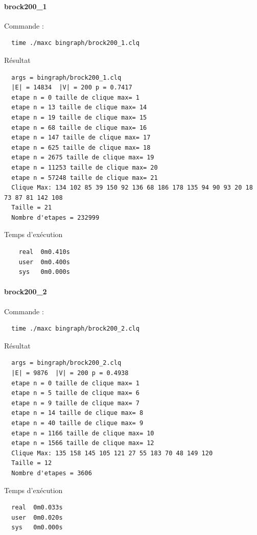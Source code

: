 \documentclass{article}
\begin{document}
\paragraph{brock200\_1}
Commande :
\begin{verbatim}
  time ./maxc bingraph/brock200_1.clq
\end{verbatim}
Résultat
\begin{verbatim}
  args = bingraph/brock200_1.clq
  |E| = 14834  |V| = 200 p = 0.7417
  etape n = 0 taille de clique max= 1
  etape n = 13 taille de clique max= 14
  etape n = 19 taille de clique max= 15
  etape n = 68 taille de clique max= 16
  etape n = 147 taille de clique max= 17
  etape n = 625 taille de clique max= 18
  etape n = 2675 taille de clique max= 19
  etape n = 11253 taille de clique max= 20
  etape n = 57248 taille de clique max= 21
  Clique Max: 134 102 85 39 150 92 136 68 186 178 135 94 90 93 20 18 73 87 81 142 108
  Taille = 21
  Nombre d'etapes = 232999
\end{verbatim}
Temps d'exécution
\begin{verbatim}
    real  0m0.410s
    user  0m0.400s
    sys   0m0.000s
\end{verbatim}
\paragraph{brock200\_2}
Commande :
\begin{verbatim}
  time ./maxc bingraph/brock200_2.clq
\end{verbatim}
Résultat
\begin{verbatim}
  args = bingraph/brock200_2.clq
  |E| = 9876  |V| = 200 p = 0.4938
  etape n = 0 taille de clique max= 1
  etape n = 5 taille de clique max= 6
  etape n = 9 taille de clique max= 7
  etape n = 14 taille de clique max= 8
  etape n = 40 taille de clique max= 9
  etape n = 1166 taille de clique max= 10
  etape n = 1566 taille de clique max= 12
  Clique Max: 135 158 145 105 121 27 55 183 70 48 149 120
  Taille = 12
  Nombre d'etapes = 3606
\end{verbatim}
Temps d'exécution
\begin{verbatim}
  real  0m0.033s
  user  0m0.020s
  sys   0m0.000s
\end{verbatim}
\end{document}
